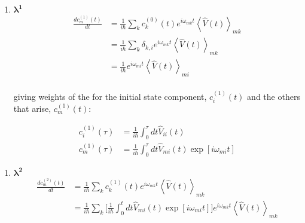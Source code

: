 \begin{enumerate}
\begin{enumerate}
  \item $ \mathbf{\lambda^{1}} $
    \begin{equation}\label{lam1}
      \begin{aligned}
        \frac{dc^{(1)}_m(t)}{dt} & = \frac{1}{i\hbar}\sum_{k}c_{k}^{(0)}(t)e^{i\omega_{mk}t} \left\langle\hat{V}(t)\right\rangle_{mk}\\
        & = \frac{1}{i\hbar}\sum_{k}\delta_{k,i}e^{i\omega_{mk}t} \left\langle\hat{V}(t)\right\rangle_{mk}\\
        & = \frac{1}{i\hbar}e^{i\omega_{mi}t} \left\langle\hat{V}(t)\right\rangle_{mi}\\
      \end{aligned}
    \end{equation}

    \noindent giving  weights of  the for  the initial  state component,
    $ c_i^{(1)}(t) $ and the others that arise, $ c_m^{(1)}(t) $:

    \begin{framed}\noindent

      \begin{equation}
        \begin{aligned}
          c_{i}^{(1)}(\tau) & = \frac{1}{i\hbar}\int_{0}^{\tau}dt\hat{V}_{ii}(t)\\
          c_{m}^{(1)}(\tau)                       &                       =
          \frac{1}{i\hbar}\int_{0}^{\tau}dt\hat{V}_{mi}(t)\exp\left[i\omega_{mi}t\right]
        \end{aligned}
      \end{equation}

    \end{framed}
  \end{enumerate}
\end{enumerate}
\noindent

\noindent

\begin{enumerate}

\item $ \mathbf{\lambda^{2}} $
  \begin{equation}\label{lam2}
    \begin{aligned}
      \frac{dc^{(2)}_m(t)}{dt} & = \frac{1}{i\hbar}\sum_{k}c_{k}^{(1)}(t)e^{i\omega_{mk}t} \left\langle\hat{V}(t)\right\rangle_{mk}\\
      &                                                                =
      \frac{1}{i\hbar}\sum_{k}\bigg[\frac{1}{i\hbar}\int_{0}^{t}dt\hat{V}_{mi}(t)\exp\left[i\omega_{mi}t\right]\bigg]e^{i\omega_{mk}t}
      \left\langle\hat{V}(t)\right\rangle_{mk}
    \end{aligned}
  \end{equation}

\end{enumerate}

